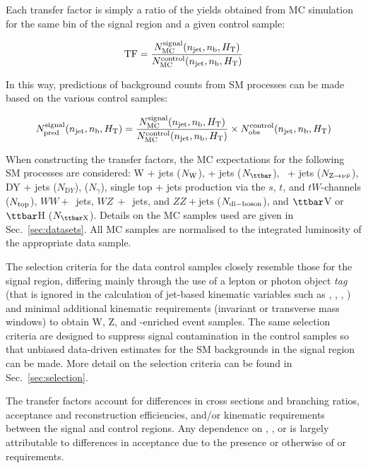 Each transfer factor is simply a ratio of the yields obtained from MC
simulation for the same bin of the signal region and a given control
sample:

\begin{equation}
  \label{equ:tf-ratio}
  {\rm TF} = \frac{N_{\rm MC}^{\rm signal}(n_{\text{jet}},n_{\text{b}},\mbox{$H_\text{T}$})}{N_{\rm
      MC}^{\rm control}(n_{\text{jet}},n_{\text{b}},\mbox{$H_\text{T}$})} 
\end{equation}

In this way, predictions of background counts from SM processes can be
made based on the various control samples:

\begin{equation}
  \label{equ:pred-method}
  N_{\textrm{pred}}^{\rm signal}(n_{\text{jet}},n_{\text{b}},\mbox{$H_\text{T}$}) = \frac{N_{\rm MC}^{\rm
      signal}(n_{\text{jet}},n_{\text{b}},\mbox{$H_\text{T}$})}{N_{\rm MC}^{\rm
      control}(n_{\text{jet}},n_{\text{b}},\mbox{$H_\text{T}$})} \times N_{\textrm{obs}}^{\rm
    control}(n_{\text{jet}},n_{\text{b}},\mbox{$H_\text{T}$})   
\end{equation}

When constructing the transfer factors, the MC expectations for the
following SM processes are considered: W + jets ($N_{\rm W}$), \ttbar
+ jets ($N_{\ttbar}$), \znunu\ + jets ($N_{{\text Z} \rightarrow \nu\bar{\nu}}$), DY + jets
($N_{\mathrm DY}$), \gj ($N_\gamma$), single top + jets
production via the $s$, $t$, and $tW$-channels ($N_{\rm top}$), $WW+$~jets, $WZ~+$~jets, and $ZZ + \textrm{jets}$ ($N_{\rm di-boson}$), and $\ttbar$V or
$\ttbar$H ($N_{\rm {\ttbar}X}$). Details on the MC
samples used are given in Sec.~\ref{sec:datasets}. All MC samples
are normalised to the integrated luminosity of the appropriate data
sample.

The selection criteria for the data control samples closely resemble
those for the signal region, differing mainly through the use of a
lepton or photon object {\it tag} (that is ignored in the calculation
of jet-based kinematic variables such as \scalht, \mht, \alphat, \etc)
and minimal additional kinematic requirements (\eg invariant or
transverse mass windows) to obtain W, Z, and \ttbar-enriched event
samples. The same selection criteria are designed to suppress signal
contamination in the control samples so that unbiased data-driven
estimates for the SM backgrounds in the signal region can be
made. More detail on the selection criteria can be found in Sec.~\ref{sec:selection}.

The transfer factors account for differences in cross sections and
branching ratios, acceptance and reconstruction efficiencies, and/or
kinematic requirements between the signal and control regions. Any
dependence on \njet, \nb, or \HT is largely attributable to
differences in acceptance due to the presence or otherwise of \alphat
or \mht requirements.

